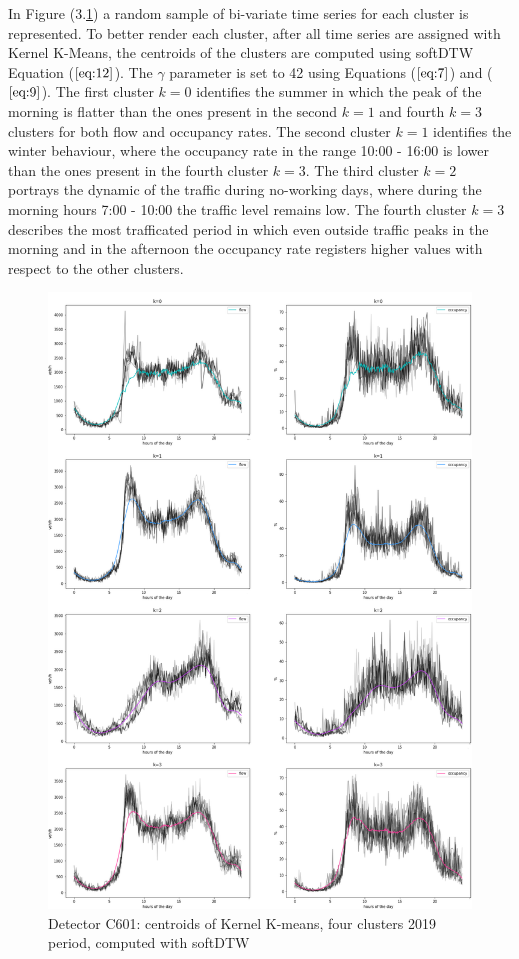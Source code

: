 \documentclass[11pt]{article}
\begin{document}
    In Figure (3.\ref{fig:3.5}) a random sample of bi-variate time series
for each cluster is represented. To better render each cluster, after
all time series are assigned with Kernel K-Means, the centroids of the
clusters are computed using softDTW Equation (\(\ref{eq:12}\)). The
\(\gamma\) parameter is set to 42 using Equations (\(\ref{eq:7}\)) and
(\(\ref{eq:9}\)). The first cluster \(k=0\) identifies the summer in
which the peak of the morning is flatter than the ones present in the
second \(k=1\) and fourth \(k=3\) clusters for both flow and occupancy
rates. The second cluster \(k=1\) identifies the winter behaviour, where
the occupancy rate in the range 10:00 - 16:00 is lower than the ones
present in the fourth cluster \(k=3\). The third cluster \(k=2\)
portrays the dynamic of the traffic during no-working days, where during
the morning hours 7:00 - 10:00 the traffic level remains low. The fourth
cluster \(k=3\) describes the most trafficated period in which even
outside traffic peaks in the morning and in the afternoon the occupancy
rate registers higher values with respect to the other clusters.

    \begin{figure}
    \centering
    \includegraphics{GAK centroids K=4 2019.png}
    \caption{Detector C601: centroids of Kernel K-means, four clusters 2019 period, computed with softDTW}
    \label{fig:3.5}
\end{figure}
\end{document}
